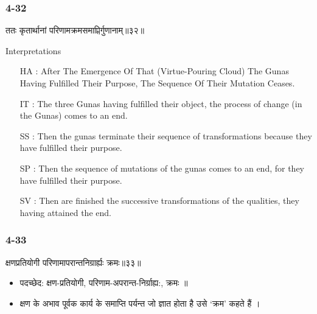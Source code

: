 \begin{frame}[fragile]\frametitle{4-32}
\begin{sanskrit}
ततः कृतार्थानां परिणामक्रमसमाप्तिर्गुणानाम्॥३२॥
\end{sanskrit}


Interpretations
\begin{itemize}	
\item [HA]: After The Emergence Of That (Virtue-Pouring Cloud) The Gunas Having Fulfilled Their Purpose, The Sequence Of Their Mutation Ceases.
\item [IT]: The three Gunas having fulfilled their object, the process of change (in the Gunas) comes to an end.
\item [SS]: Then the gunas terminate their sequence of transformations because they have fulfilled their purpose.
\item [SP]: Then the sequence of mutations of the gunas comes to an end, for they have fulfilled their purpose.
\item [SV]: Then are finished the successive transformations of the qualities, they having attained the end. 
\end{itemize}
\end{frame}

\begin{frame}[fragile]\frametitle{4-33}
\begin{sanskrit}
क्षणप्रतियोगी परिणामापरान्तनिग्रार्ह्यः क्रमः॥३३॥
\end{sanskrit}

\begin{itemize}
\item पदच्छेद:  क्षण-प्रतियोगी, परिणाम-अपरान्त-निर्ग्राह्य:, क्रमः ॥
\item क्षण के अभाव पूर्वक कार्य के समाप्ति पर्यन्त जो ज्ञात होता है उसे ‘क्रम’ कहते हैं ।
\end{itemize}
\end{frame}

